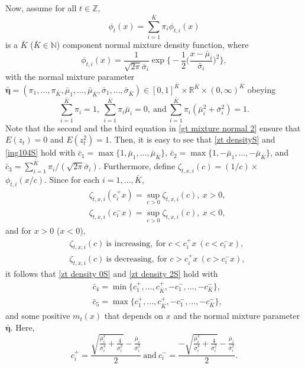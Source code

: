 \documentclass[ejsv2]{imsart}
\theoremstyle{plain}
\theoremstyle{definition}
\theoremstyle{remark}
\begin{document}
\begin{appendix}
Now, assume for all $t \in \mathbb{Z}$,
\begin{equation}\label{gt mixture normal}
\phi_t(x)=\sum_{i=1}^{\bar{K}}\pi_i\phi_{t,i}(x)
\end{equation}
is a $\bar{K}$ ($\bar{K}\in\mathbb{N}$) component normal mixture density function, where
$$\phi_{t,i}(x)=\frac{1}{\sqrt{2\pi}\bar{\sigma}_i}\exp\bigg\{-\frac{1}{2}\bigg(\frac{x-\bar{\mu}_i}{\bar{\sigma}_i}\bigg)^2\bigg\},$$
with the normal mixture parameter $\bar{\bm{\eta}}=(\pi_1,\ldots,\pi_{\bar{K}},\bar{\mu}_1,\ldots,\bar{\mu}_{\bar{K}},\bar{\sigma}_1,\ldots,\bar{\sigma}_{\bar{K}})\in[0,1]^{\bar{K}}\times\mathbb{R}^{\bar{K}}\times(0,\infty)^{\bar{K}}$ obeying
\begin{equation}\label{gt mixture normal 2}
\sum_{i=1}^{\bar{K}}\pi_i=1,\ \sum_{i=1}^{\bar{K}}\pi_i\bar{\mu}_i=0,\ \textrm{and}\ \sum_{i=1}^{\bar{K}}\pi_i(\bar{\mu}_i^2+\bar{\sigma}_i^2)=1.
\end{equation}
Note that the second and the third equation in \eqref{gt mixture normal 2} ensure that $E(z_t)=0$ and $E(z_t^2)=1$. Then, it is easy to see that \eqref{zt densityS} and \eqref{ing104S} hold with $\bar{c}_1=\max\{1,\bar{\mu}_1,\ldots,\bar{\mu}_{\bar{K}}\}$, $\bar{c}_2=\max\{1,-\bar{\mu}_1,\ldots,-\bar{\mu}_{\bar{K}}\}$, and $\bar{c}_3=\sum_{i=1}^{\bar{K}}\pi_i/(\sqrt{2\pi}\bar{\sigma}_i)$. Furthermore, define $\zeta_{t,x,i}(c)=(1/c)\times$\\$\phi_{t,i}(x/c)$. Since for each $i=1,\ldots,\bar{K}$,
\begin{equation}\label{gt mixture normal 3}
\begin{split}
     & \zeta_{t,x,i}(c^+_i x)=\sup_{c>0} \zeta_{t,x,i}(c),\ x>0, \\
     & \zeta_{t,x,i}(c^-_i x)=\sup_{c>0} \zeta_{t,x,i}(c),\ x<0,
\end{split}
\end{equation}
and for $x>0$ ($x<0$),
\begin{equation}\label{gt mixture normal 4}
\begin{split}
     &  \zeta_{t,x,i}(c)\ \textrm{is increasing},\ \mbox{for } c<c^+_i x\ (c<c^-_i x),\\
     &  \zeta_{t,x,i}(c)\ \textrm{is decreasing},\ \mbox{for } c>c^+_i x\ (c>c^-_i x),
\end{split}
\end{equation}
it follows that \eqref{zt density 0S} and \eqref{zt density 2S} hold with
\begin{equation*}
\begin{split}
     & \bar{c}_4=\min\{c^+_1,\ldots,c^+_{\bar{K}},-c^-_1,\ldots,-c^-_{\bar{K}}\}, \\
     & \bar{c}_5=\max\{c^+_1,\ldots,c^+_{\bar{K}},-c^-_1,\ldots,-c^-_{\bar{K}}\},
\end{split}
\end{equation*}
and some positive $m_t(x)$ that depends on 
$x$ and the normal mixture parameter $\bar{\bm{\eta}}$.
Here,
$$c^+_i=\frac{\sqrt{\frac{\bar{\mu}_i^2}{\bar{\sigma}_i^4}+\frac{4}{\bar{\sigma}_i^2}}-\frac{\bar{\mu}_i}{\bar{\sigma}_i^2}}{2}\ \textrm{and}\
c^-_i=\frac{-\sqrt{\frac{\bar{\mu}_i^2}{\bar{\sigma}_i^4}+\frac{4}{\bar{\sigma}_i^2}}-\frac{\bar{\mu}_i}{\bar{\sigma}_i^2}}{2}.$$


\end{appendix}
\end{document}
